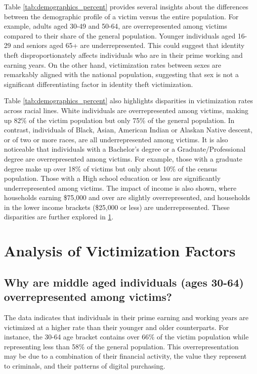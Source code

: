 Table \ref{tab:demographics_percent} provides several insights about the differences between the demographic profile of a victim versus the entire population. For example, adults aged 30-49 and 50-64, are overrepresented among victims compared to their share of the general population. Younger individuals aged 16-29 and seniors aged 65+ are underrepresented. This could suggest that identity theft disproportionately affects individuals who are in their prime working and earning years. On the other hand, victimization rates between sexes are remarkably aligned with the national population, suggesting that sex is not a significant differentiating factor in identity theft victimization. 

Table \ref{tab:demographics_percent} also highlights disparities in victimization rates across racial lines. White individuals are overrepresented among victims, making up 82\% of the victim population but only 75\% of the general population. In contrast, individuals of Black, Asian, American Indian or Alaskan Native descent, or of two or more races, are all underrepresented among victims. It is also noticeable that individuals with a Bachelor's degree or a Graduate/Professional degree are overrepresented among victims. For example, those with a graduate degree make up over 18\% of victims but only about 10\% of the census population. Those with a High school education or less are significantly underrepresented among victims. The impact of income is also shown, where households earning \$75,000 and over are slightly overrepresented, and  households in the lower income brackets (\$25,000 or less) are underrepresented. These disparities are further explored in \ref{app:underrep}.

\section{Analysis of Victimization Factors}
\label{app:underrep}

\subsection{Why are middle aged individuals (ages 30-64)  overrepresented among victims?}
The data indicates that individuals in their prime earning and working years are victimized at a higher rate than their younger and older counterparts. For instance, the 30-64 age bracket contains over 66\% of the victim population while representing less than 58\% of the general population. This overrepresentation may be due to a combination of their financial activity, the value they represent to criminals, and their patterns of digital purchasing. 

